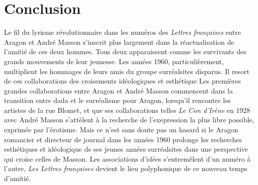 \chapter*{Conclusion} 
Le fil du lyrisme révolutionnaire dans les numéros des \emph{Lettres françaises} entre Aragon et André Masson s'inscrit plus largement dans la réactualisation de l'amitié de ces deux hommes. Tous deux apparaissent comme les survivants des grands mouvements de leur jeunesse. Les années 1960, particulièrement, multiplient les hommages de leurs amis du groupe surréalsites disparus. Il resort de ces collaborations des croisements idéologiques et esthétique Les premières grandes collaborations entre Aragon et André Masson commencent dans la transition entre dada et le surréalisme pour Aragon, lorsqu'il rencontre les artistes de la rue Blomet, et que ses collaborations telles \emph{Le Con d'Irène  } en 1928 avec André Masson s'attèlent à la recherche de l'exepression la plus libre possible, exprimée par l'érotisme. Mais ce n'est sans doute pas un hasard si le Aragon romancier et directeur de journal dans les années 1960 prolonge les recherches esthétiques et idéologique de ses jeunes années surréalsites dans une perspective qui croise celles de Masson. Les associations d'idées s'entremêlent d'un numéro à l'autre, \emph{Les Lettres françaises} devient le lieu polyphonique de ce nouveau temps d'amitié. 

